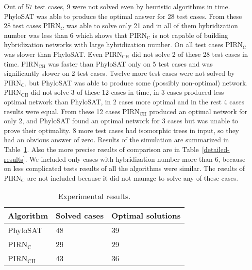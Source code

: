 \documentclass[runningheads, envcountsame, a4paper]{llncs}
\begin{document}
Out of 57 test cases, 9 were not solved even by heuristic algorithms in time. PhyloSAT was able to produce the optimal answer for 28
test cases. From these 28 test cases PIRN$\mathrm{_C}$ was able to solve only 21 and in all of them hybridization number was less than 6
which shows that PIRN$\mathrm{_C}$ is not capable of building hybridization networks with large hybridization number.
On all test cases PIRN$\mathrm{_C}$ was slower than PhyloSAT.
Even PIRN$\mathrm{_{CH}}$ did not solve 2 of these 28 test cases in time. PIRN$\mathrm{_{CH}}$ was faster than PhyloSAT only
on 5 test cases and was significantly slower on 2 test cases. Twelve more test cases were not solved by PIRN$\mathrm{_C}$, but PhyloSAT
was able to produce some (possibly non-optimal) network. PIRN$\mathrm{_{CH}}$ did not solve 3 of these 12 cases in time, in 3 cases 
produced less optimal network than PhyloSAT, in 2 cases more optimal and in the rest 4 cases results were equal. From these 12 cases PIRN$\mathrm{_{CH}}$
produced an optimal network for only 2, and PhyloSAT found an optimal network for 3 cases but was unable to prove their optimality. 
8 more test cases had isomorphic trees in input, so they had an obvious answer of zero.
Results of the simulation are summarized in Table~\ref{exp-results-table}.
Also the more precise results of comparison are in Table~\ref{detailed-results}. We included only cases with hybridization number more than 6, because on less complicated tests results of all the algorithms were similar.
The results of PIRN$\mathrm{_{C}}$ are not included because it did not manage to solve any of these cases. 

\begin{table}[t]
\centering
\caption{Experimental results.}
\begin{tabular}{l | l | l}
  Algorithm & Solved cases & Optimal solutions \\
  
  \hline
  PhyloSAT & 48 & 39 \\
  PIRN$\mathrm{_C}$ & 29 & 29 \\
  PIRN$\mathrm{_{CH}}$ & 43 & 36 \\
  
\end{tabular}
\label{exp-results-table}
\end{table}
\end{document}
